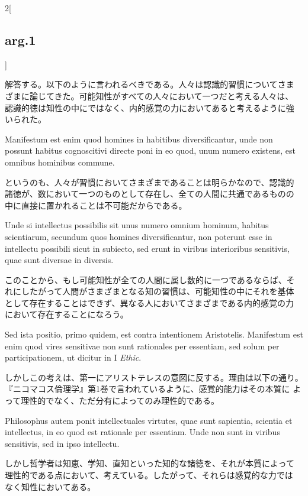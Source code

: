 \documentclass[paper=a4paper,fontsize=10pt,jafontsize=9pt,titlepage]{jlreq}
\begin{document}
\begin{paracol}{2}[\subsection{arg.1}]
\switchcolumn

解答する。以下のように言われるべきである。人々は認識的習慣についてさま
ざまに論じてきた。可能知性がすべての人々において一つだと考える人々は、
認識的徳は知性の中にではなく、内的感覚の力においてあると考えるように強
いられた。

\switchcolumn*

Manifestum est enim quod homines in habitibus
 diversificantur, unde non possunt habitus cognoscitivi directe poni
 in eo quod, unum numero existens, est omnibus hominibus commune.

\switchcolumn

というのも、人々が習慣においてさまざまであることは明らかなので、認識的
諸徳が、数において一つのものとして存在し、全ての人間に共通であるものの
中に直接に置かれることは不可能だからである。

\switchcolumn*

Unde si intellectus possibilis sit unus numero omnium hominum, habitus
scientiarum, secundum quos homines diversificantur, non poterunt esse
in intellectu possibili sicut in subiecto, sed erunt in viribus
interioribus sensitivis, quae sunt diversae in diversis.

\switchcolumn

このことから、もし可能知性が全ての人間に属し数的に一つであるならば、そ
れにしたがって人間がさまざまとなる知の習慣は、可能知性の中にそれを基体
として存在することはできず、異なる人においてさまざまである内的感覚の力
において存在することになろう。

\switchcolumn*

Sed ista positio, primo quidem, est contra intentionem
Aristotelis. Manifestum est enim quod vires sensitivae non sunt
rationales per essentiam, sed solum per participationem, ut dicitur in
I {\itshape Ethic}.

\switchcolumn

しかしこの考えは、第一にアリストテレスの意図に反する。理由は以下の通り。
『ニコマコス倫理学』第1巻で言われているように、感覚的能力はその本質に
よって理性的でなく、ただ分有によってのみ理性的である。

\switchcolumn*

Philosophus autem ponit intellectuales virtutes, quae sunt sapientia,
scientia et intellectus, in eo quod est rationale per essentiam. Unde
non sunt in viribus sensitivis, sed in ipso intellectu.

\switchcolumn

しかし哲学者は知恵、学知、直知といった知的な諸徳を、それが本質によって
理性的である点において、考えている。したがって、それらは感覚的な力では
なく知性においてある。


\end{paracol}
\end{document}
